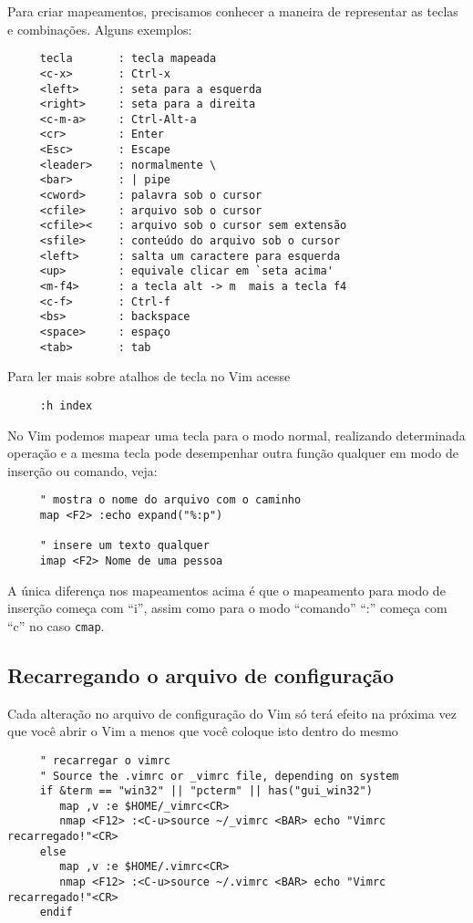 Para criar mapeamentos, precisamos conhecer a maneira de representar
as teclas e combinações. Alguns exemplos:

\begin{verbatim}
     tecla       : tecla mapeada
     <c-x>       : Ctrl-x
     <left>      : seta para a esquerda
     <right>     : seta para a direita
     <c-m-a>     : Ctrl-Alt-a
     <cr>        : Enter
     <Esc>       : Escape
     <leader>    : normalmente \
     <bar>       : | pipe
     <cword>     : palavra sob o cursor
     <cfile>     : arquivo sob o cursor
     <cfile><    : arquivo sob o cursor sem extensão
     <sfile>     : conteúdo do arquivo sob o cursor
     <left>      : salta um caractere para esquerda
     <up>        : equivale clicar em `seta acima'
     <m-f4>      : a tecla alt -> m  mais a tecla f4
     <c-f>       : Ctrl-f
     <bs>        : backspace
     <space>     : espaço
     <tab>       : tab
\end{verbatim}

Para ler mais sobre atalhos de tecla no Vim acesse 

\begin{verbatim}
     :h index
\end{verbatim}

No Vim podemos mapear uma tecla para o modo normal, realizando
determinada operação e a mesma tecla pode desempenhar outra função
qualquer em modo de inserção ou comando, veja:

\begin{verbatim}
     " mostra o nome do arquivo com o caminho
     map <F2> :echo expand("%:p")
     
     " insere um texto qualquer
     imap <F2> Nome de uma pessoa
\end{verbatim}

A única diferença nos mapeamentos acima é que o mapeamento para modo
de inserção começa com ``i'', assim como para o modo ``comando'' ``:'' começa
com ``c'' no caso \verb|cmap|.

\subsection{Recarregando o arquivo de configuração}
\label{sec:Recarregando o arquivo de configuração}

Cada alteração no arquivo de configuração do Vim só terá efeito na próxima vez que você
abrir o Vim a menos que você coloque isto dentro do mesmo

\begin{verbatim}
     " recarregar o vimrc
     " Source the .vimrc or _vimrc file, depending on system
     if &term == "win32" || "pcterm" || has("gui_win32")
        map ,v :e $HOME/_vimrc<CR>
        nmap <F12> :<C-u>source ~/_vimrc <BAR> echo "Vimrc recarregado!"<CR>
     else
        map ,v :e $HOME/.vimrc<CR>
        nmap <F12> :<C-u>source ~/.vimrc <BAR> echo "Vimrc recarregado!"<CR>
     endif
\end{verbatim}

